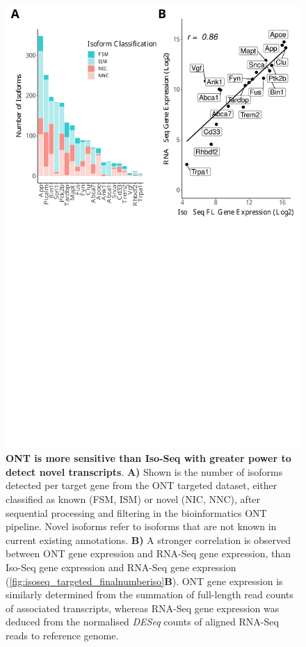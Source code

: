 \begin{figure}[!htp]
	\begin{center}
		\includegraphics[page=2,trim={0 20cm 0 0cm},clip,scale = 0.60]{Figures/ONTvsIsoSeq.pdf}
	\end{center}
	\captionsetup{width=0.95\textwidth}
	\caption[ONT is more sensitive than Iso-Seq with greater power to detect novel transcripts]%
	{\textbf{ONT is more sensitive than Iso-Seq with greater power to detect novel transcripts}. \textbf{A)} Shown is the number of isoforms detected per target gene from the ONT targeted dataset, either classified as known (FSM, ISM) or novel (NIC, NNC), after sequential processing and filtering in the bioinformatics ONT pipeline. Novel isoforms refer to isoforms that are not known in current existing annotations. \textbf{B)} A stronger correlation is observed between ONT gene expression and RNA-Seq gene expression, than Iso-Seq gene expression and RNA-Seq gene expression (\cref{fig:isoseq_targeted_finalnumberiso}\textbf{B}). ONT gene expression is similarly determined from the summation of full-length read counts of associated transcripts, whereas RNA-Seq gene expression was deduced from the normalised \textit{DESeq} counts of aligned RNA-Seq reads to reference genome\cite{Castanho2020}.}
	\label{fig:ont_targeted_finalnumberiso}
\end{figure}

